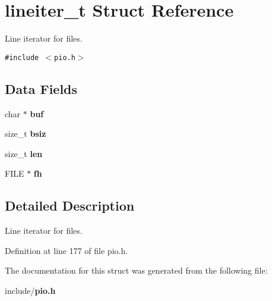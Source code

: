 \section{lineiter\_\-t Struct Reference}
\label{structlineiter__t}
Line iterator for files.  


{\tt \#include $<$pio.h$>$}

\subsection*{Data Fields}
\begin{CompactItemize}
\item 
char $\ast$ \textbf{buf}\label{structlineiter__t_1bf482b3c2722af76102f7b4aae08e47}

\item 
size\_\-t \textbf{bsiz}\label{structlineiter__t_b9aef9582ea19e23370fab75981ae022}

\item 
size\_\-t \textbf{len}\label{structlineiter__t_d7faa6892d4a6d9e4e41c6d7dce4b590}

\item 
FILE $\ast$ \textbf{fh}\label{structlineiter__t_08628d796a4850494f29f62dc0e55148}

\end{CompactItemize}


\subsection{Detailed Description}
Line iterator for files. 

Definition at line 177 of file pio.h.

The documentation for this struct was generated from the following file:\begin{CompactItemize}
\item 
include/{\bf pio.h}\end{CompactItemize}
